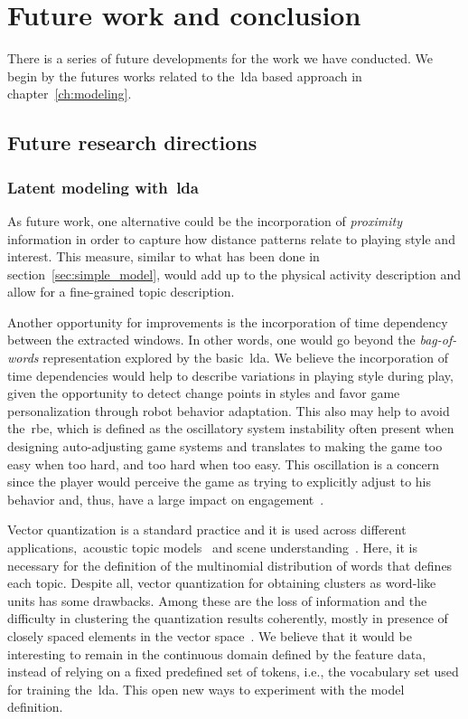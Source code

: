 \chapter{Future work and conclusion}\label{ch:future}

There is a series of future developments for the work we have conducted. We begin by the futures works related to the~\gls{lda} based approach in chapter~\ref{ch:modeling}.

\section{Future research directions}
\subsection{Latent modeling with~\glsdesc{lda}}\label{sec:future_lda}
As future work, one alternative could be the incorporation of \textit{proximity} information in order to capture how distance patterns relate to playing style and interest. This measure, similar to what has been done in section~\ref{sec:simple_model}, would add up to the physical activity description and allow for a fine-grained topic description.

Another opportunity for improvements is the incorporation of time dependency between the extracted windows. In other words, one would go beyond the \textit{bag-of-words} representation explored by the basic~\gls{lda}. We believe the incorporation of time dependencies would help to describe variations in playing style during play, given the opportunity to detect change points in styles and favor game personalization through robot behavior adaptation. This also may help to avoid the~\gls{rbe}, which is defined as the oscillatory system instability often present when designing auto-adjusting game systems and translates to making the game too easy when too hard, and too hard when too easy. This oscillation is a concern since the player would perceive the game as trying to explicitly adjust to his behavior and, thus, have a large impact on engagement~\citep{martinoia_physically_2013}.

Vector quantization is a standard practice and it is used across different applications,~\eg acoustic topic models~\citep{kim_acoustic_2009,kim_audio_2009} and scene understanding~\citep{cao_spatially_2007,li_towards_2009,niu_context_2012}. Here, it is necessary for the definition of the multinomial distribution of words that defines each topic. Despite all, vector quantization for obtaining clusters as word-like units has some drawbacks. Among these are the loss of information and the difficulty in clustering the quantization results coherently, mostly in presence of closely spaced elements in the vector space~\citep{hu_latent_2012}.
We believe that it would be interesting to remain in the continuous domain defined by the feature data, instead of relying on a fixed predefined set of tokens, i.e., the vocabulary set used for training the~\gls{lda}. This open new ways to experiment with the model definition.

